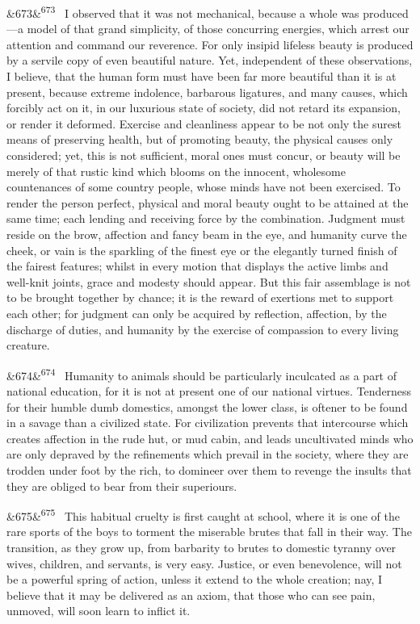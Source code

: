 \documentclass[12pt]{article}
\newcommand{\para}[1][]{\par\noindent\ifx&#1&\else\textsuperscript{\footnotesize #1}~\fi}
\begin{document}
\para[673] I observed that it was not mechanical, because a whole was produced---a model of that grand simplicity, of those concurring energies, which arrest our attention and command our reverence. For only insipid lifeless beauty is produced by a servile copy of even beautiful nature. Yet, independent of these observations, I believe, that the human form must have been far more beautiful than it is at present, because extreme indolence, barbarous ligatures, and many causes, which forcibly act on it, in our luxurious state of society, did not retard its expansion, or render it deformed. Exercise and cleanliness appear to be not only the surest means of preserving health, but of promoting beauty, the physical causes only considered; yet, this is not sufficient, moral ones must concur, or beauty will be merely of that rustic kind which blooms on the innocent, wholesome countenances of some country people, whose minds have not been exercised. To render the person perfect, physical and moral beauty ought to be attained at the same time; each lending and receiving force by the combination. Judgment must reside on the brow, affection and fancy beam in the eye, and humanity curve the cheek, or vain is the sparkling of the finest eye or the elegantly turned finish of the fairest features; whilst in every motion that displays the active limbs and well-knit joints, grace and modesty should appear. But this fair assemblage is not to be brought together by chance; it is the reward of exertions met to support each other; for judgment can only be acquired by reflection, affection, by the discharge of duties, and humanity by the exercise of compassion to every living creature.

\para[674] Humanity to animals should be particularly inculcated as a part of national education, for it is not at present one of our national virtues. Tenderness for their humble dumb domestics, amongst the lower class, is oftener to be found in a savage than a civilized state. For civilization prevents that intercourse which creates affection in the rude hut, or mud cabin, and leads uncultivated minds who are only depraved by the refinements which prevail in the society, where they are trodden under foot by the rich, to domineer over them to revenge the insults that they are obliged to bear from their superiours.

\para[675] This habitual cruelty is first caught at school, where it is one of the rare sports of the boys to torment the miserable brutes that fall in their way. The transition, as they grow up, from barbarity to brutes to domestic tyranny over wives, children, and servants, is very easy. Justice, or even benevolence, will not be a powerful spring of action, unless it extend to the whole creation; nay, I believe that it may be delivered as an axiom, that those who can see pain, unmoved, will soon learn to inflict it.
\end{document}

